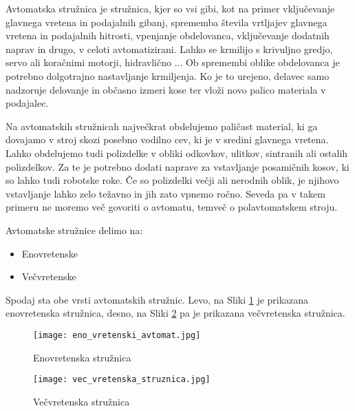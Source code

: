 Avtomatska stružnica je stružnica, kjer so vsi
gibi, kot na primer vključevanje glavnega vretena
in podajalnih gibanj, sprememba števila vrtljajev
glavnega vretena in podajalnih hitrosti, vpenjanje
obdelovanca, vključevanje dodatnih naprav in drugo,
v celoti avtomatizirani. Lahko se krmilijo s krivuljno gredjo,
servo ali koračnimi motorji, hidravlično ... Ob spremembi oblike
obdelovanca je potrebno dolgotrajno nastavljanje krmiljenja.
Ko je to urejeno, delavec samo nadzoruje delovanje
in občasno izmeri kose ter vloži novo palico materiala
v podajalec.

Na avtomatskih stružnicah največkrat obdelujemo paličast
material, ki ga dovajamo v stroj skozi posebno vodilno
cev, ki je v sredini glavnega vretena. Lahko obdelujemo tudi
polizdelke v obliki odkovkov, ulitkov, sintranih ali ostalih polizdelkov.
Za te je potrebno dodati naprave za vstavljanje posamičnih kosov,
ki so lahko tudi robotske roke.
Če so polizdelki večji ali
nerodnih oblik, je njihovo vstavljanje lahko zelo težavno
in jih zato vpnemo ročno. Seveda pa v takem primeru
ne moremo več govoriti o avtomatu, temveč o
polavtomatskem stroju.

\noindent Avtomatske stružnice delimo na:
\begin{itemize}
	\item Enovretenske
	\item Večvretenske
\end{itemize}

Spodaj sta obe vrsti avtomatskih stružnic. Levo, na Sliki \ref{eno_vretenska_struznica}
je prikazana enovretenska stružnica, desno, na Sliki \ref{vec_vretenska_struznica}
pa je prikazana večvretenska stružnica.

\begin{multicols}{2}
	\begin{figure}[H]
		\texttt{[image: eno\_vretenski\_avtomat.jpg]}
		\caption{Enovretenska stružnica
			\cite{eno_vretenska_struznica}}
		\label{eno_vretenska_struznica}
	\end{figure}

	\columnbreak

	\begin{figure}[H]
		\texttt{[image: vec\_vretenska\_struznica.jpg]}
		\caption{Večvretenska stružnica
			\cite{vec_vretenska_struznica}}
		\label{vec_vretenska_struznica}
	\end{figure}
\end{multicols}
